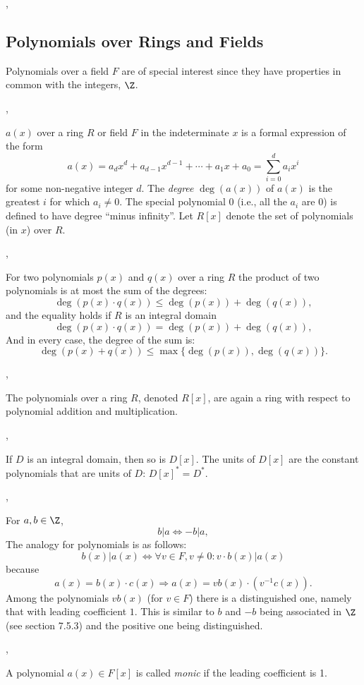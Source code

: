 \sep

\subsection{Polynomials over Rings and Fields}

Polynomials over a field $F$ are of special interest since they have properties
in common with the integers, $\Z$.

\sep

\Def[Polynomial] $a(x)$ over a ring $R$ or field $F$ in the indeterminate
$x$ is a formal expression of the form
\[
a(x) = a_d x^d + a_{d-1}x^{d-1} + \cdots + a_1x + a_0 = \sum_{i=0}^{d} a_i x^i
\]
for some non-negative integer $d$. The \emph{degree} $\deg(a(x))$ of $a(x)$ is
the greatest $i$ for which $a_i\neq 0$. The special polynomial $0$ (i.e., all
the $a_i$ are 0) is defined to have degree ``minus infinity''. Let $R[x]$ denote
the set of polynomials (in $x$) over $R$.

\sep

\Lem For two polynomials $p(x)$ and $q(x)$ over a ring $R$ the product of two
polynomials is at most the sum of the degrees:
\[
\deg(p(x)\cdot q(x))\leq\deg(p(x)) + \deg(q(x)),
\]
and the equality holds if $R$ is an integral domain
\[
\deg(p(x)\cdot q(x))=\deg(p(x)) + \deg(q(x)),
\]
And in every case, the degree of the sum is:
\[
\deg(p(x)+q(x)) \leq \max\{\deg(p(x)),\deg(q(x))\}.
\]

\sep

\Thm The polynomials over a ring $R$, denoted $R[x]$, are again a ring with
respect to polynomial addition and multiplication.

\sep

\Lem If $D$ is an integral domain, then
  so is $D[x]$. The units of $D[x]$ are the constant polynomials that are units
  of $D$: $D[x]^* = D^*$.

\sep

For $a,b\in \Z$,
\[
b|a \Longleftrightarrow -b|a,
\]
The analogy for polynomials is as follows:
\[
b(x)|a(x) \Longleftrightarrow \forall v\in F, v\neq 0 : v \cdot b(x)|a(x) 
\]
because
\[
a(x)=b(x)\cdot c(x) \Longrightarrow a(x)=v b(x) \cdot \left(v^{-1} c(x)\right).
\]
Among the polynomials $vb(x)$ (for $v\in F$) there is a distinguished one,
namely that with leading coefficient $1$. This is similar to $b$ and $-b$ being
associated in $\Z$ (see section 7.5.3) and the positive one being distinguished.

\sep

 A polynomial $a(x)\in F[x]$ is called \emph{monic} if the
leading coefficient is 1.

